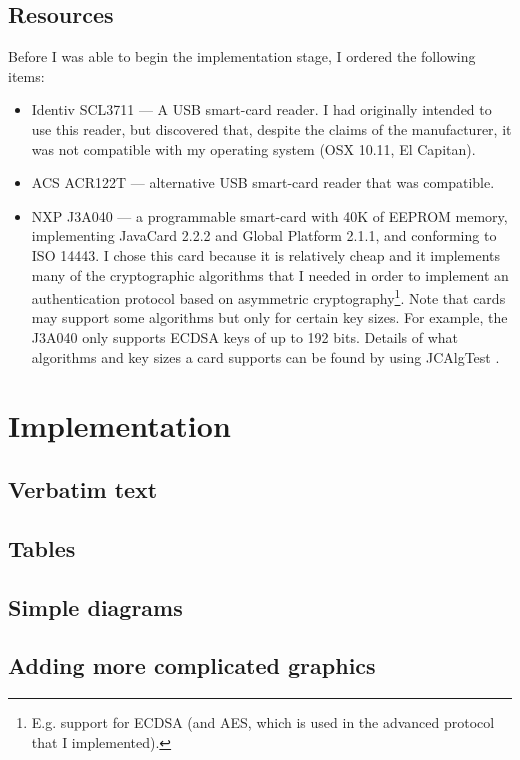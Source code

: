 \documentclass[12pt,a4paper,twoside,openright]{report}
\begin{document}
\section{Resources}

Before I was able to begin the implementation stage, I ordered the following items:

\begin{itemize}
\item Identiv SCL3711 --- A USB smart-card reader. I had originally intended to use this reader, but discovered that, despite the claims of the manufacturer, it was not compatible with my operating system (OSX 10.11, El Capitan).
\item ACS ACR122T --- alternative USB smart-card reader that was compatible.
\item NXP J3A040 --- a programmable smart-card with 40K of EEPROM memory, implementing JavaCard 2.2.2 and Global Platform 2.1.1, and conforming to ISO 14443. I chose this card because it is relatively cheap and it implements many of the cryptographic algorithms that I needed in order to implement an authentication protocol based on asymmetric cryptography\footnote{E.g. support for ECDSA (and AES, which is used in the advanced protocol that I implemented).}. Note that cards may support some algorithms but only for certain key sizes. For example, the J3A040 only supports ECDSA keys of up to 192 bits. Details of what algorithms and key sizes a card supports can be found by using JCAlgTest \cite{jcalgtest}.
\end{itemize}

\chapter{Implementation}

\section{Verbatim text}

\section{Tables}

\section{Simple diagrams}

\section{Adding more complicated graphics}
\end{document}
